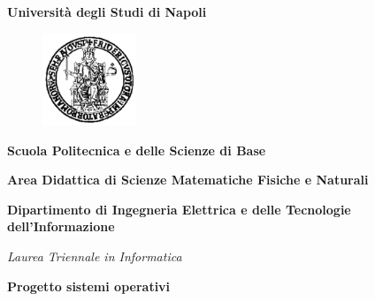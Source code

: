 \documentclass[a4paper,12pt,openright,oneside]{book}
\begin{document}
 
\begin{titlepage}


\begin{center}
    {\bfseries\Huge Università degli Studi di Napoli\\}
\end{center} 

\begin{figure}[h]
    \begin{center}
        
\includegraphics[width=0.25\textwidth]{fiilogo.png}    %
    \end{center}
\end{figure}
  
\begin{center}
    \bf{Scuola Politecnica e delle Scienze di Base}
\end{center}
\begin{center}
    \bf{Area Didattica di Scienze Matematiche Fisiche e Naturali}
\end{center}
\vspace{5pt}
\begin{center}
    \textbf{Dipartimento di Ingegneria Elettrica e delle Tecnologie dell'Informazione}
\end{center}
\vspace{40pt}
\begin{center}
    {{ \textit{Laurea Triennale in Informatica}}}
\end{center}
\vspace{15pt}


\begin{center}
    {\Large{\bf{Progetto sistemi operativi}}}
\end{center}





\end{titlepage}
\end{document}
